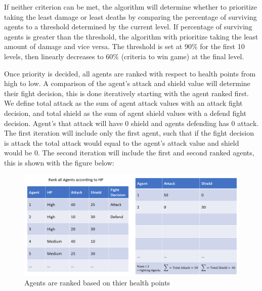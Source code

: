 \noindent 

\noindent If neither criterion can be met, the algorithm will determine whether to prioritize taking the least damage or least deaths by comparing the percentage of surviving agents to a threshold determined by the current level. If percentage of surviving agents is greater than the threshold, the algorithm with prioritize taking the least amount of damage and vice versa. The threshold is set at 90\% for the first 10 levels, then linearly decreases to 60\% (criteria to win game) at the final level.

\noindent 

\noindent Once priority is decided, all agents are ranked with respect to health points from high to low. A comparison of the agent's attack and shield value will determine their fight decision, this is done iteratively starting with the agent ranked first. We define total attack as the sum of agent attack values with an attack fight decision, and total shield as the sum of agent shield values with a defend fight decision. Agent's that attack will have 0 shield and agents defending has 0 attack. The first iteration will include only the first agent, such that if the fight decision is attack the total attack would equal to the agent's attack value and shield would be 0. The second iteration will include the first and second ranked agents, this is shown with the figure below:
\begin{figure}[htb]
    \centering
    \includegraphics[width=1\textwidth]{008_team_5_agent_design/images/Rank-all-Agents-by-hp.png}
    \caption{Agents are ranked based on thier health points}
    \label{rankagents}
\end{figure}


